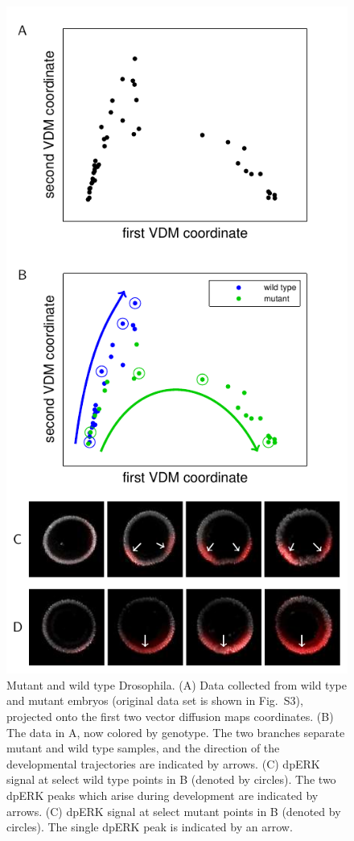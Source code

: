 \documentclass{pnastwo}
\newcommand{\fig}[0]{Fig.}
\begin{document}
\begin{article}
\begin{figure}[h!]
\includegraphics{fig5}
\caption{Mutant and wild type {\xfigtextfontit Drosophila}.  {\xfigtextfontit(A)} Data collected from wild type and mutant embryos (original data set is shown in \fig~S3), projected onto the first two vector diffusion maps coordinates. {\xfigtextfontit (B)} The data in {\xfigtextfontit A}, now colored by genotype. The two branches separate mutant and wild type samples, and the direction of the developmental trajectories are indicated by arrows. {\xfigtextfontit (C)} dpERK signal at select wild type points in {\xfigtextfontit B} (denoted by circles). The two dpERK peaks which arise during development are indicated by arrows. {\xfigtextfontit (C)} dpERK signal at select mutant points in {\xfigtextfontit B} (denoted by circles). The single dpERK peak is indicated by an arrow. }

\end{figure}
\end{article}
\end{document}
